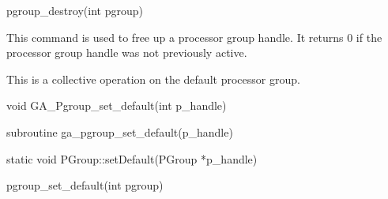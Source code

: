 \documentclass[12pt]{article}
\begin{document}
\begin{pyapi}
\begin{pycode}
pgroup_destroy(int pgroup)
\end{pycode}
\end{pyapi}

\begin{desc}

  This command is used to free up a processor group handle. It returns
  0 if the processor group handle was not previously active.

  This is a collective operation on the default processor group.

\end{desc}


\begin{capi}
\begin{ccode}
void GA_Pgroup_set_default(int p_handle)
\end{ccode}
\begin{funcargs}
\end{funcargs}
\end{capi}

\begin{fapi}
\begin{fcode}
subroutine ga_pgroup_set_default(p_handle)
\end{fcode}
\begin{funcargs}
\end{funcargs}
\end{fapi}

\begin{cxxapi}
\begin{cxxcode}
static void PGroup::setDefault(PGroup *p_handle)
\end{cxxcode}
\begin{funcargs}
\end{funcargs}
\end{cxxapi}

\begin{pyapi}
\begin{pycode}
pgroup_set_default(int pgroup)
\end{pycode}
\end{pyapi}
\end{document}
